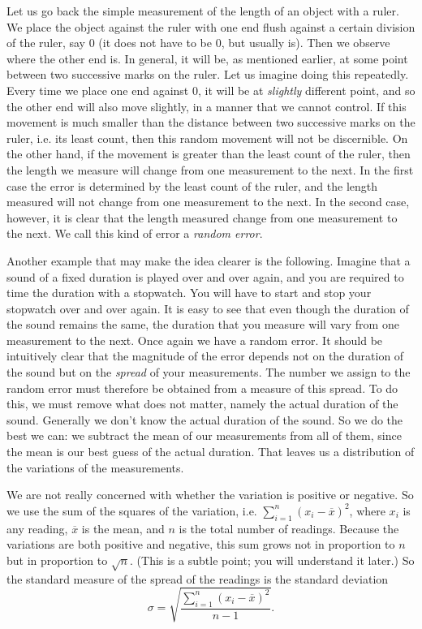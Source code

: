 Let us go back the simple measurement of the length of an object with a ruler. We place the object against the ruler with one end flush against a certain division of the ruler, say 0 (it does not have to be 0, but usually is). Then we observe where the other end is. In general, it will be, as mentioned earlier, at some point between two successive marks on the ruler. Let us imagine doing this repeatedly. Every time we place one end against 0, it will be at \textit{slightly} different point, and so the other end will also move slightly, in a manner that we cannot control. If this movement is much smaller than the distance between two successive marks on the ruler, i.e. its least count, then this random movement will not be discernible. On the other hand, if the movement is greater than the least count of the ruler, then the length we measure will change from one measurement to the next. In the first case the error is determined by the least count of the ruler, and the length measured will not change from one measurement to the next. In the second case, however, it is clear that the length measured  change from one measurement to the next. We call this kind of error a \textit{random error}.

Another example that may make the idea clearer is the following. Imagine that a sound of a fixed duration is played over and over again, and you are required to time the duration with a stopwatch. You will have to start and stop your stopwatch over and over again. It is easy to see that even though the duration of the sound remains the same, the duration that you measure will vary from one measurement to the next. Once again we have a random error. It should be intuitively clear that the magnitude of the error depends not on the duration of the sound but on the \textit{spread} of your measurements. The number we assign to the random error must therefore be obtained from a measure of this spread. To do this, we must remove what does not matter, namely the actual duration of the sound. Generally we don't know the actual duration of the sound. So we do the best we can: we subtract the mean of our measurements from all of them, since the mean is our best guess of the actual duration. That leaves us a distribution of the variations of the measurements. 

We are not really concerned with whether the variation is positive or negative. So we use the sum of the squares of the variation, i.e. $\sum_{i = 1}^{n}(x_i - \overline{x})^2$, where $x_i$ is any reading, $\overline{x}$ is the mean, and $n$ is the total number of readings. Because the variations are both positive and negative, this sum grows not in proportion to $n$ but in proportion to $\sqrt{n}$. (This is a subtle point; you will understand it later.) So the standard measure of the spread of the readings is the standard deviation 
\begin{equation*}
    \sigma = \sqrt{\frac{\sum_{i = 1}^{n}(x_i - \overline{x})^2}{n - 1}}.
\end{equation*}


